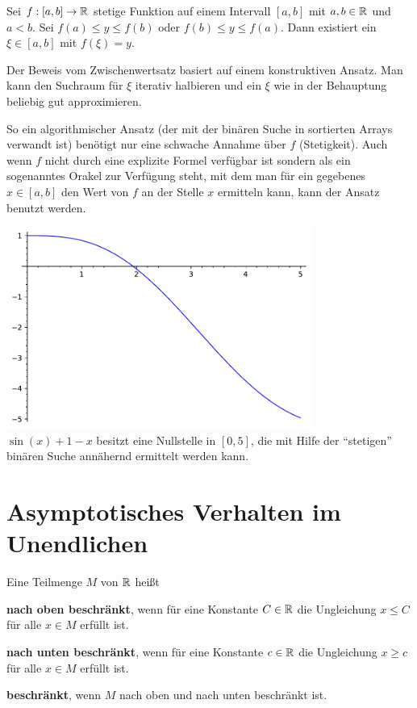 \begin{thm}[Zwischenwertsatz] 
	Sei $f : [a,b] \to \mathbb{R}$ stetige Funktion auf einem  Intervall $[a,b]$ mit $a,b \in \mathbb{R}$ und $a<b$. Sei $f(a) \le y \le f(b)$ oder $f(b) \le y \le f(a)$. Dann existiert ein $\xi \in [a,b]$ mit $f(\xi) = y$. 
\end{thm}

\begin{bem} 
	Der Beweis vom Zwischenwertsatz basiert auf einem konstruktiven Ansatz. Man kann den Suchraum für $\xi$ iterativ halbieren und ein $\xi$ wie in der Behauptung beliebig gut approximieren. 
	
	
	
	So ein algorithmischer Ansatz (der mit der binären Suche in sortierten Arrays verwandt ist) benötigt nur eine schwache Annahme über $f$ (Stetigkeit). Auch wenn $f$ nicht durch eine explizite Formel verfügbar ist sondern als ein sogenanntes Orakel zur Verfügung steht, mit dem man für ein gegebenes $x \in [a,b]$ den Wert von $f$ an der Stelle $x$ ermitteln kann, kann der Ansatz benutzt werden. 
	
	\begin{center}
	\includegraphics[width=10cm]{pics/continuous_binary_search_ex.pdf} 
	\\
	$\sin(x) + 1 - x$ besitzt eine Nullstelle in $[0,5]$, die mit Hilfe der ``stetigen'' binären Suche annähernd ermittelt werden kann. 
\end{center} 

\end{bem} 

\section{Asymptotisches Verhalten im Unendlichen} 

\begin{defn}
	Eine Teilmenge $M$ von $\mathbb{R}$ heißt
	\begin{enuma}
		\item \textbf{nach oben beschränkt}, wenn für eine Konstante $C \in \mathbb{R}$ die Ungleichung $x \le C$ für alle $x \in M$ erfüllt ist. 
		\item \textbf{nach unten beschränkt}, wenn für eine Konstante $c \in \mathbb{R}$ die Ungleichung $x \ge c$ für alle $x \in M$ erfüllt ist. 
		\item \textbf{beschränkt}, wenn $M$ nach oben und nach unten beschränkt ist. 
	\end{enuma}
\end{defn} 

